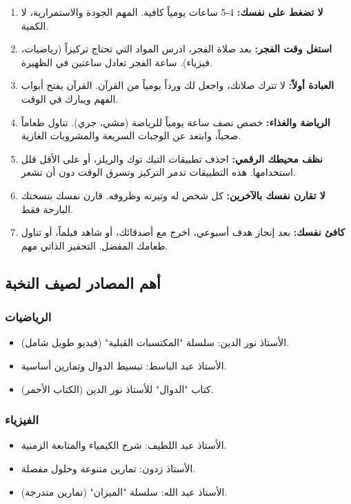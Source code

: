 \documentclass[12pt,a4paper]{book}
\begin{document}
	\begin{enumerate}
		\item \textbf{لا تضغط على نفسك:} 4-5 ساعات يومياً كافية. المهم الجودة والاستمرارية، لا الكمية.
		\item \textbf{استغل وقت الفجر:} بعد صلاة الفجر، ادرس المواد التي تحتاج تركيزاً (رياضيات، فيزياء). ساعة الفجر تعادل ساعتين في الظهيرة.
		\item \textbf{العبادة أولاً:} لا تترك صلاتك، واجعل لك ورداً يومياً من القرآن. القرآن يفتح أبواب الفهم ويبارك في الوقت.
		\item \textbf{الرياضة والغذاء:} خصص نصف ساعة يومياً للرياضة (مشي، جري). تناول طعاماً صحياً، وابتعد عن الوجبات السريعة والمشروبات الغازية.
		\item \textbf{نظف محيطك الرقمي:} احذف تطبيقات التيك توك والريلز، أو على الأقل قلل استخدامها. هذه التطبيقات تدمر التركيز وتسرق الوقت دون أن تشعر.
		\item \textbf{لا تقارن نفسك بالآخرين:} كل شخص له وتيرته وظروفه. قارن نفسك بنسختك البارحة فقط.
		\item \textbf{كافئ نفسك:} بعد إنجاز هدف أسبوعي، اخرج مع أصدقائك، أو شاهد فيلماً، أو تناول طعامك المفضل. التحفيز الذاتي مهم.
	\end{enumerate}
	
	\subsection{أهم المصادر لصيف النخبة}
	
	\subsubsection{الرياضيات}
	\begin{itemize}
		\item الأستاذ نور الدين: سلسلة "المكتسبات القبلية" (فيديو طويل شامل).
		\item الأستاذ عبد الباسط: تبسيط الدوال وتمارين أساسية.
		\item كتاب "الدوال" للأستاذ نور الدين (الكتاب الأحمر).
	\end{itemize}
	
	\subsubsection{الفيزياء}
	\begin{itemize}
		\item الأستاذ عبد اللطيف: شرح الكيمياء والمتابعة الزمنية.
		\item الأستاذ زدون: تمارين متنوعة وحلول مفصلة.
		\item الأستاذ عبد الله: سلسلة "الميزان" (تمارين متدرجة).
	\end{itemize}
	
\end{document}
